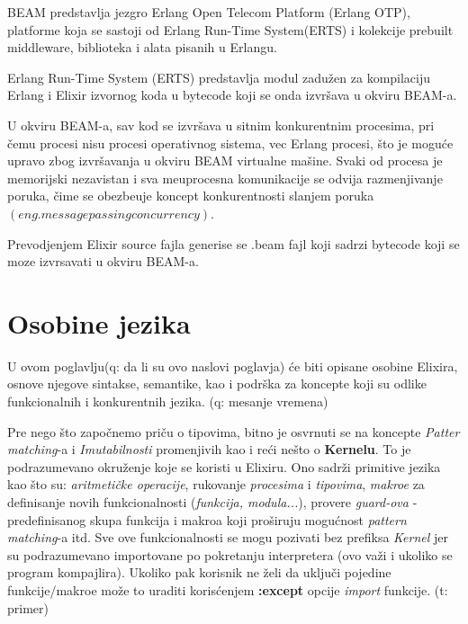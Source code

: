 \documentclass[a4paper]{article}
\begin{document}
BEAM predstavlja jezgro Erlang Open Telecom Platform (Erlang OTP), platforme koja se sastoji od Erlang Run-Time System(ERTS) i  kolekcije prebuilt middleware, biblioteka i alata pisanih u Erlangu.

Erlang Run-Time System (ERTS) predstavlja modul zadu\v{z}en za kompilaciju Erlang i Elixir izvornog koda u bytecode koji se onda izvr\v{s}ava u okviru BEAM-a.

U okviru BEAM-a, sav kod se izvr\v{s}ava u sitnim konkurentnim procesima, pri \v{c}emu procesi nisu procesi operativnog sistema, vec Erlang procesi, \v{s}to je mogu\'{c}e upravo zbog izvr\v{s}avanja u okviru BEAM virtualne ma\v{s}ine. Svaki od procesa je memorijski nezavistan i sva me\dj{}uprocesna komunikacije se odvija razmenjivanje poruka, \v{c}ime se obezbe\dj{}uje koncept konkurentnosti slanjem poruka $(eng. message passing concurrency)$. 

Prevodjenjem Elixir source fajla generise se .beam fajl koji sadrzi bytecode koji se moze izvrsavati u okviru BEAM-a.



\section{Osobine jezika}
\label{sec:osobine}
U ovom poglavlju(q: da li su ovo naslovi poglavja) će biti opisane osobine Elixira, osnove njegove sintakse, semantike, kao i podrška za koncepte koji su odlike funkcionalnih i konkurentnih jezika. (q: mesanje vremena) 

Pre nego što započnemo priču o tipovima, bitno je osvrnuti se na koncepte \textit{Patter matching}-a i \textit{Imutabilnosti} promenjivih kao i reći nešto o \textbf{Kernelu}. To je podrazumevano okruženje koje se koristi u Elixiru. Ono sadrži primitive jezika kao što su: \textit{aritmetičke operacije}, rukovanje \textit{procesima} i \textit{tipovima}, \textit{makroe} za definisanje novih funkcionalnosti (\textit{funkcija, modula...}), provere \textit{guard-ova} - predefinisanog skupa funkcija i makroa koji proširuju mogućnost \textit{pattern matching}-a itd. Sve ove funkcionalnosti se mogu pozivati bez prefiksa \textit{Kernel} jer su podrazumevano importovane po pokretanju interpretera (ovo važi i ukoliko se program kompajlira). Ukoliko pak korisnik ne želi da uključi pojedine funkcije/makroe može to uraditi korisćenjem \textbf{:except} opcije \textit{import} funkcije. (t: primer)
\end{document}
